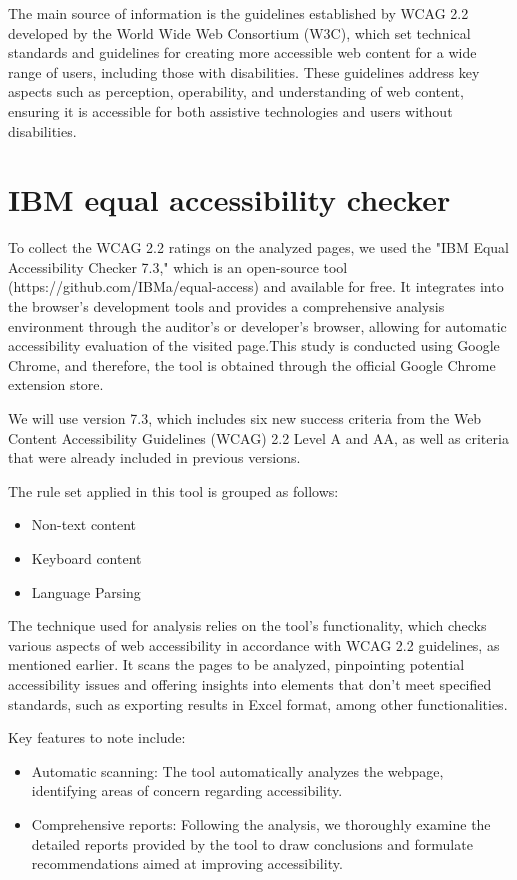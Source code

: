 \documentclass{IEEEtran}
\begin{document}
The main source of information is the guidelines established by WCAG 2.2 developed by the World Wide Web Consortium (W3C), which set technical standards and guidelines for creating more accessible web content for a wide range of users, including those with disabilities. These guidelines address key aspects such as perception, operability, and understanding of web content, ensuring it is accessible for both assistive technologies and users without disabilities.

\section{IBM equal accessibility checker}
To collect the WCAG 2.2 ratings on the analyzed pages, we used the "IBM Equal Accessibility Checker 7.3," which is an open-source tool (https://github.com/IBMa/equal-access) and available for free. It integrates into the browser's development tools and provides a comprehensive analysis environment through the auditor's or developer's browser, allowing for automatic accessibility evaluation of the visited page.This study is conducted using Google Chrome, and therefore, the tool is obtained through the official Google Chrome extension store.

We will use version 7.3, which includes six new success criteria from the Web Content Accessibility Guidelines (WCAG) 2.2 Level A and AA, as well as criteria that were already included in previous versions.

The rule set applied in this tool is grouped as follows:

\begin{itemize}
    \item Non-text content
    \item Keyboard content
    \item Language Parsing
\end{itemize}

The technique used for analysis relies on the tool's functionality, which checks various aspects of web accessibility in accordance with WCAG 2.2 guidelines, as mentioned earlier. It scans the pages to be analyzed, pinpointing potential accessibility issues and offering insights into elements that don't meet specified standards, such as exporting results in Excel format, among other functionalities.

Key features to note include:

\begin{itemize}
    \item Automatic scanning: The tool automatically analyzes the webpage, identifying areas of concern regarding accessibility.
    \item Comprehensive reports: Following the analysis, we thoroughly examine the detailed reports provided by the tool to draw conclusions and formulate recommendations aimed at improving accessibility.
\end{itemize}
\end{document}
